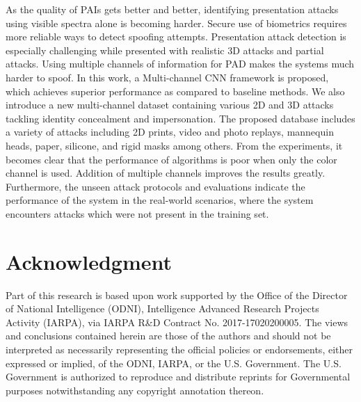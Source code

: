 \documentclass[journal]{IEEEtran}
\begin{document}
As the quality of PAIs gets better and better, identifying presentation attacks using visible spectra alone is becoming harder. Secure use of biometrics requires more reliable ways to detect spoofing attempts. Presentation attack detection is especially challenging while presented with realistic 3D attacks and partial attacks. Using multiple channels of information for PAD makes the systems much harder to spoof. In this work, a Multi-channel CNN  framework is proposed, which achieves superior performance as compared to baseline methods.
We also introduce a new multi-channel dataset containing various 2D and 3D attacks tackling identity concealment and impersonation. The proposed database includes a variety of attacks including 2D prints, video and photo replays, mannequin heads, paper, silicone, and rigid masks among others.  From the experiments, it becomes clear that the performance of algorithms is poor when only the color channel is used. Addition of multiple channels improves the results greatly. Furthermore, the unseen attack protocols and evaluations indicate the performance of the system in the real-world scenarios, where the system encounters attacks which were not present in the training set.


\section*{Acknowledgment}

Part of this research is based upon work supported by the Office of the
Director of National Intelligence (ODNI), Intelligence Advanced Research
Projects Activity (IARPA), via IARPA R\&D Contract No. 2017-17020200005.
The views and conclusions contained herein are those of the authors and
should not be interpreted as necessarily representing the official
policies or endorsements, either expressed or implied, of the ODNI,
IARPA, or the U.S. Government. The U.S. Government is authorized to
reproduce and distribute reprints for Governmental purposes
notwithstanding any copyright annotation thereon.

\ifCLASSOPTIONcaptionsoff
  \newpage
\fi






\end{document}
